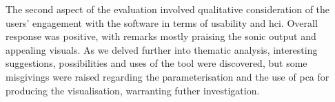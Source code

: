 The second aspect of the evaluation involved qualitative consideration of the users' engagement with the software in terms of usability and \acrshort{hci}. Overall response was positive, with remarks mostly praising the sonic output and appealing visuals. As we delved further into thematic analysis, interesting suggestions, possibilities and uses of the tool were discovered, but some misgivings were raised regarding the parameterisation and the use of \acrshort{pca} for producing the visualisation, warranting futher investigation.


 

 
